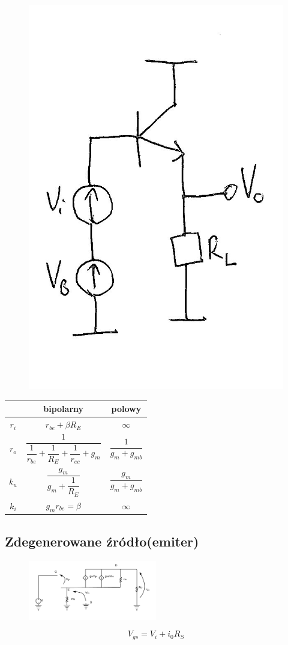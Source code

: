 \documentclass[10pt,a4paper]{article}
\begin{document}
\begin{figure}[H]
\centering
\includegraphics[height=0.5\textwidth]{WC}
\end{figure}
\begin{tabular}{c|c|c}
& bipolarny & polowy\\
\hline
$r_i$ & $r_{be} + \beta R_E$ & $\infty$ \\ 

$r_o$ & $\dfrac{1}{\dfrac{1}{r_{be}}+\dfrac{1}{R_E}+\dfrac{1}{r_{ec}}+g_m}$ & $\dfrac{1}{g_m + g_{mb}}$ \\ 

$k_u$ & $\dfrac{g_m}{g_m+\dfrac{1}{R_E}}$ & $\dfrac{g_m}{g_m+g_{mb}}$ \\ 

$k_i$ & $g_m r_{be} = \beta$ & $\infty$ \\ 

\end{tabular} 


\subsection{Zdegenerowane źródło(emiter)}


\begin{figure}[H]
\centering
\includegraphics[width=0.5\textwidth]{DS}
\end{figure}

\begin{equation}
V_{gs} = V_i + i_0R_S 
\end{equation}
\end{document}
